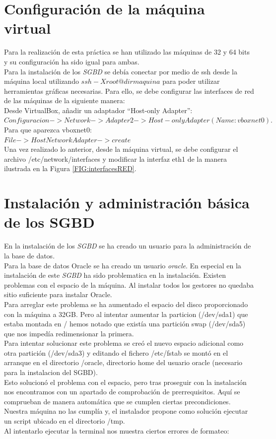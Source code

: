\documentclass{article}
\begin{document}
\section{Configuración de la máquina virtual}
Para la realización de esta práctica se han utilizado las máquinas de 32 y 64 bits y su configuración ha sido igual para ambas.\\

Para la instalación de los \emph{SGBD} se debía conectar por medio de ssh  desde la máquina local utilizando $ssh -X root@dirmaquina$ para poder utilizar herramientas gráficas necesarias. Para ello, se debe configurar las interfaces de red de las máquinas de la siguiente manera:\\
Desde VirtualBox, añadir un adaptador “Host-only Adapter”:\\
$Configuracion->Network->Adapter2->Host-only Adapter (Name: vboxnet0).$
\\
Para que aparezca vboxnet0:\\
$File->Host Network Adapter->create$
\\
Una vez realizado lo anterior, desde la máquina virtual, se debe configurar el archivo /etc/network/interfaces y modificar la interfaz eth1 de la manera ilustrada en la Figura \ref{FIG:interfacesRED}.


\section{Instalación y administración básica de los SGBD}

En la instalación de los \emph{SGBD} se ha creado un usuario para la administración de la base de datos.\\
Para la base de datos Oracle se ha creado un usuario \emph{oracle}. En especial en la instalación de este \emph{SGBD} ha sido problematica en la instalación. Existen problemas con el espacio de la máquina. Al instalar todos los gestores no quedaba sitio suficiente para instalar Oracle.\\
Para arreglar este problema se ha aumentado el espacio del disco proporcionado con la máquina a 32GB. Pero al intentar aumentar la particion (/dev/sda1)
que estaba montada en / hemos notado que existía una partición swap (/dev/sda5) que nos impedía redimensionar la primera.\\
Para intentar solucionar este problema se creó el nuevo espacio adicional como otra partición (/dev/sda3) y editando el fichero /etc/fstab se montó en el arranque
en el directorio /oracle, directorio home del usuario oracle (necesario para la instalacion del SGBD).\\
Esto solucionó el problema con el espacio, pero tras proseguir con la instalación nos encontramos con un apartado de comprobación de prerrequisitos. Aquí se comprueban
de manera automática que se cumplen ciertas precondiciones. Nuestra máquina no las cumplía y, el instalador propone como solución ejecutar un script ubicado en el directorio
/tmp.\\
Al intentarlo ejecutar la terminal nos muestra ciertos errores de formateo:
\end{document}
